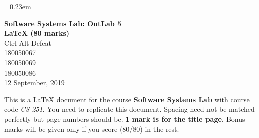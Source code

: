 \documentclass[english,12pt]{article}
\begin{document}
{}\font=0.23em
\begin{titlepage}
\begin{center}
\vspace*{67mm}
\textbf{\Huge{Software Systems Lab: OutLab 5}}\\[3mm]
\textbf{\Huge{\LaTeX{ }(80 marks)}}\\[1cm]
\LARGE{Ctrl Alt Defeat}\\[5mm]
\normalsize{180050067}\\[1mm]
\normalsize{180050069}\\[1mm]
\normalsize{180050086}\\[1cm]
\large{12 September, 2019}
\end{center}
\end{titlepage}
\tableofcontents
{}
\newpage
This is a \LaTeX{} document for the course \textbf{Software Systems Lab} with course code \textit{CS 251}. You need to replicate this document. Spacing need not be matched perfectly but page numbers should be. \textbf{1 mark is for the title page.} Bonus marks will be given only if you score (80/80) in the rest. 
\end{document}
